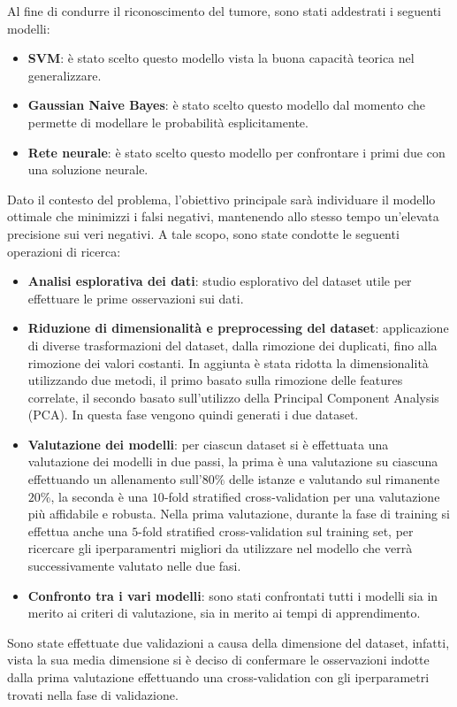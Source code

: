 Al fine di condurre il riconoscimento del tumore, sono stati addestrati i
seguenti modelli:
\begin{itemize}
      \item \textbf{SVM}: è stato scelto questo modello vista la buona capacità
            teorica nel generalizzare.
      \item \textbf{Gaussian Naive Bayes}: è stato scelto questo modello dal
            momento che permette di modellare le probabilità esplicitamente.
      \item \textbf{Rete neurale}: è stato scelto questo modello per confrontare
            i primi due con una soluzione neurale.
\end{itemize}
Dato il contesto del problema, l'obiettivo principale sarà individuare il modello
ottimale che minimizzi i falsi negativi, mantenendo allo stesso tempo un'elevata
precisione sui veri negativi. A tale scopo, sono state condotte le seguenti
operazioni di ricerca:
\begin{itemize}
      \item \textbf{Analisi esplorativa dei dati}: studio esplorativo del dataset
            utile per effettuare le prime osservazioni sui dati.
      \item \textbf{Riduzione di dimensionalità e preprocessing del dataset}:
            applicazione di diverse trasformazioni del dataset, dalla rimozione
            dei duplicati, fino alla rimozione dei valori costanti. In aggiunta è
            stata ridotta la dimensionalità utilizzando due metodi, il primo
            basato sulla rimozione delle features correlate, il secondo basato
            sull'utilizzo della Principal Component Analysis (PCA). In questa fase
            vengono quindi generati i due dataset.
      \item \textbf{Valutazione dei modelli}: per ciascun dataset si è effettuata
            una valutazione dei modelli in due passi, la prima è una valutazione
            su ciascuna effettuando un allenamento sull'$80\%$ delle istanze e
            valutando sul rimanente $20\%$, la seconda è una $10$-fold stratified
            cross-validation per una valutazione più affidabile e robusta.
            Nella prima valutazione, durante la fase di training si effettua anche
            una $5$-fold stratified cross-validation sul training set, per
            ricercare gli iperparamentri migliori da utilizzare nel modello che
            verrà successivamente valutato nelle due fasi.
      \item \textbf{Confronto tra i vari modelli}: sono stati confrontati tutti
            i modelli sia in merito ai criteri di valutazione, sia in merito ai
            tempi di apprendimento.
\end{itemize}
Sono state effettuate due validazioni a causa della dimensione del dataset,
infatti, vista la sua media dimensione si è deciso di confermare le osservazioni
indotte dalla prima valutazione effettuando una cross-validation con gli
iperparametri trovati nella fase di validazione.

